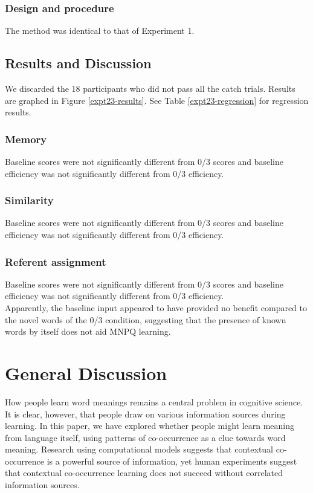 \documentclass[man,floatsintext]{apa6}
\begin{document}
\subsubsection{Design and procedure}
The method was identical to that of Experiment 1.

\subsection{Results and Discussion}
We discarded the 18 participants who did not pass all the catch trials. Results are graphed in Figure \ref{expt23-results}. See Table \ref{expt23-regression} for regression results.

\subsubsection{Memory}
Baseline scores were not significantly different from 0/3 scores and baseline efficiency was not significantly different from 0/3 efficiency.

\subsubsection{Similarity}
Baseline scores were not significantly different from 0/3 scores and baseline efficiency was not significantly different from 0/3 efficiency.

\subsubsection{Referent assignment}
Baseline scores were not significantly different from 0/3 scores and baseline efficiency was not significantly different from 0/3 efficiency.\\

Apparently, the baseline input appeared to have provided no benefit compared to the novel words of the 0/3 condition, suggesting that the presence of known words by itself does not aid MNPQ learning.

\section{General Discussion}

How people learn word meanings remains a central problem in cognitive science. It is clear, however, that people draw on various information sources during learning. In this paper, we have explored whether people might learn meaning from language itself, using patterns of co-occurrence as a clue towards word meaning. Research using computational models suggests that contextual co-occurrence is a powerful source of information, yet human experiments suggest that contextual co-occurrence learning does not succeed without correlated information sources.
\end{document}
